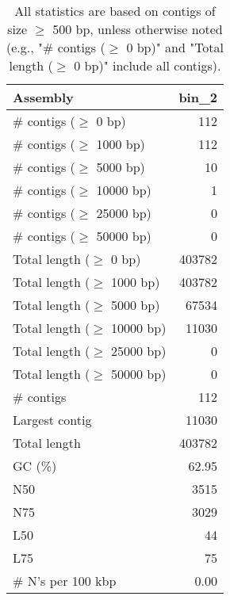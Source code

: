 \documentclass[12pt,a4paper]{article}
\begin{document}
\begin{table}[ht]
\begin{center}
\caption{All statistics are based on contigs of size $\geq$ 500 bp, unless otherwise noted (e.g., "\# contigs ($\geq$ 0 bp)" and "Total length ($\geq$ 0 bp)" include all contigs).}
\begin{tabular}{|l*{1}{|r}|}
\hline
Assembly & bin\_2 \\ \hline
\# contigs ($\geq$ 0 bp) & 112 \\ \hline
\# contigs ($\geq$ 1000 bp) & 112 \\ \hline
\# contigs ($\geq$ 5000 bp) & 10 \\ \hline
\# contigs ($\geq$ 10000 bp) & 1 \\ \hline
\# contigs ($\geq$ 25000 bp) & 0 \\ \hline
\# contigs ($\geq$ 50000 bp) & 0 \\ \hline
Total length ($\geq$ 0 bp) & 403782 \\ \hline
Total length ($\geq$ 1000 bp) & 403782 \\ \hline
Total length ($\geq$ 5000 bp) & 67534 \\ \hline
Total length ($\geq$ 10000 bp) & 11030 \\ \hline
Total length ($\geq$ 25000 bp) & 0 \\ \hline
Total length ($\geq$ 50000 bp) & 0 \\ \hline
\# contigs & 112 \\ \hline
Largest contig & 11030 \\ \hline
Total length & 403782 \\ \hline
GC (\%) & 62.95 \\ \hline
N50 & 3515 \\ \hline
N75 & 3029 \\ \hline
L50 & 44 \\ \hline
L75 & 75 \\ \hline
\# N's per 100 kbp & 0.00 \\ \hline
\end{tabular}
\end{center}
\end{table}
\end{document}

